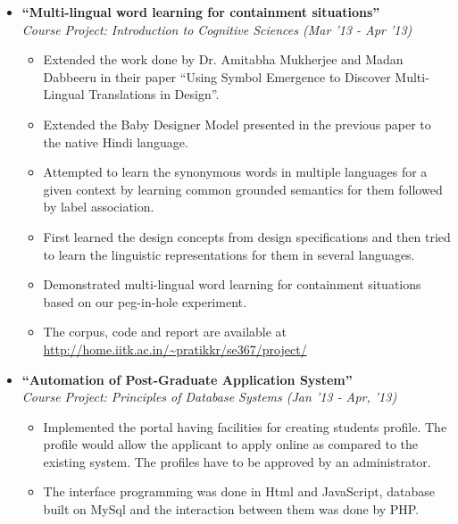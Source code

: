 \documentclass[margin,line]{resume}
\begin{document}
\begin{resume}
\begin{itemize}
  \item \large{\textbf{\textsf{``Multi-lingual word learning for containment situations''}}}
    \\ \small{\textit{Course Project: Introduction to Cognitive Sciences (Mar '13 - Apr '13)}}
    \normalsize
    \begin{itemize}
    \item Extended the work done by Dr. Amitabha Mukherjee and Madan Dabbeeru in their paper ``Using Symbol Emergence to Discover Multi-Lingual Translations in Design''.
    \item Extended the Baby Designer Model presented in the previous paper to the native Hindi language.
    \item Attempted to learn the synonymous words in multiple languages for a given context by learning common grounded semantics for them followed by label association. 
    \item First learned the design concepts from design specifications and then tried to learn the linguistic representations for them in several languages. 
    \item Demonstrated multi-lingual word learning for containment situations based on our peg-in-hole experiment. 
    \item The corpus, code and report are available at \url{http://home.iitk.ac.in/~pratikkr/se367/project/}
    \end{itemize}

  \item \large{\textbf{\textsf{``Automation of Post-Graduate Application System''}}}
    \\ \small{\textit{Course Project: Principles of Database Systems (Jan '13 - Apr, '13)}}
    \normalsize
    \begin{itemize}
    \item Implemented the portal having facilities for creating students profile. The profile would allow the applicant to apply online as compared to the existing system. The profiles have to be approved by an administrator.         
    \item The interface programming was done in Html and JavaScript, database built on MySql and the interaction between them was done by PHP.
    \end{itemize}


\end{itemize}
\end{resume}
\end{document}

